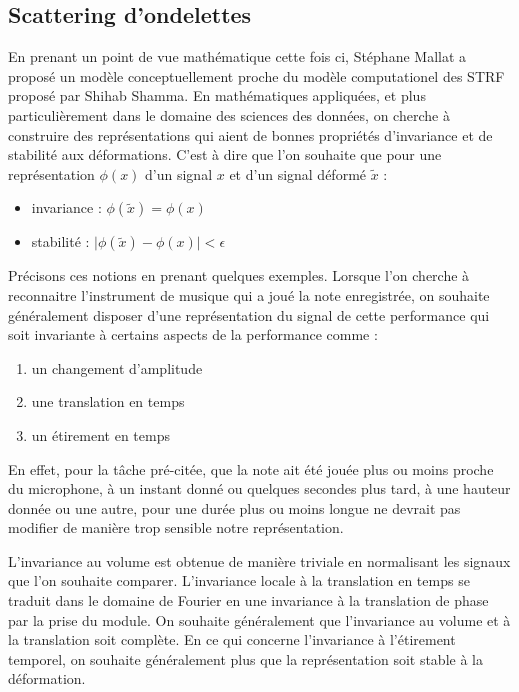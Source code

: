 \subsection{\nmu Scattering d'ondelettes}  \label{sec:scattering}

En prenant un point de vue mathématique cette fois ci, Stéphane Mallat a proposé un modèle conceptuellement proche du modèle computationel des STRF proposé par Shihab Shamma. En mathématiques appliquées, et plus particulièrement dans le domaine des sciences des données, on cherche à construire des représentations qui aient de bonnes propriétés d'invariance et de stabilité aux déformations. C'est à dire que l'on souhaite que pour une représentation $\phi(x)$ d'un signal $x$ et d'un signal déformé $\tilde x$ :
\begin{itemize}
  \item invariance : $\phi(\tilde x) = \phi(x)$
  \item stabilité : $ \vert \phi(\tilde x) - \phi(x) | < \epsilon $
\end{itemize}

Précisons ces notions en prenant quelques exemples. Lorsque l'on cherche à reconnaitre l'instrument de musique qui a joué la note enregistrée, on souhaite généralement disposer d'une représentation du signal de cette performance qui soit invariante à certains aspects de la performance comme :
\begin{enumerate}
  \item un changement d'amplitude
  \item une translation en temps
  \item un étirement en temps
\end{enumerate}
En effet, pour la tâche pré-citée, que la note ait été jouée plus ou moins proche du microphone, à un instant donné ou quelques secondes plus tard, à une hauteur donnée ou une autre, pour une durée plus ou moins longue ne devrait pas modifier de manière trop sensible notre représentation.

L'invariance au volume est obtenue de manière triviale en normalisant les signaux que l'on souhaite comparer. L'invariance locale à la translation en temps se traduit dans le domaine de Fourier en une invariance à la translation de phase par la prise du module. On souhaite généralement que l'invariance au volume et à la translation soit complète. En ce qui concerne l'invariance à l'étirement temporel, on souhaite généralement plus que la représentation soit stable à la déformation.

